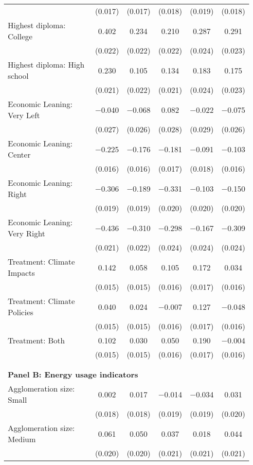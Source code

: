 \begin{tabular}{@{\extracolsep{5pt}}lccccc}
  & (0.017) & (0.017) & (0.018) & (0.019) & (0.018) \\ 
  Highest diploma: College & 0.402 & 0.234 & 0.210 & 0.287 & 0.291 \\ 
  & (0.022) & (0.022) & (0.022) & (0.024) & (0.023) \\ 
  Highest diploma: High school & 0.230 & 0.105 & 0.134 & 0.183 & 0.175 \\ 
  & (0.021) & (0.022) & (0.021) & (0.024) & (0.023) \\ 
  Economic Leaning: Very Left & $-$0.040 & $-$0.068 & 0.082 & $-$0.022 & $-$0.075 \\ 
  & (0.027) & (0.026) & (0.028) & (0.029) & (0.026) \\ 
  Economic Leaning: Center & $-$0.225 & $-$0.176 & $-$0.181 & $-$0.091 & $-$0.103 \\ 
  & (0.016) & (0.016) & (0.017) & (0.018) & (0.016) \\ 
  Economic Leaning: Right & $-$0.306 & $-$0.189 & $-$0.331 & $-$0.103 & $-$0.150 \\ 
  & (0.019) & (0.019) & (0.020) & (0.020) & (0.020) \\ 
  Economic Leaning: Very Right & $-$0.436 & $-$0.310 & $-$0.298 & $-$0.167 & $-$0.309 \\ 
  & (0.021) & (0.022) & (0.024) & (0.024) & (0.024) \\ 
  Treatment: Climate Impacts & 0.142 & 0.058 & 0.105 & 0.172 & 0.034 \\ 
  & (0.015) & (0.015) & (0.016) & (0.017) & (0.016) \\ 
  Treatment: Climate Policies & 0.040 & 0.024 & $-$0.007 & 0.127 & $-$0.048 \\ 
  & (0.015) & (0.015) & (0.016) & (0.017) & (0.016) \\ 
  Treatment: Both & 0.102 & 0.030 & 0.050 & 0.190 & $-$0.004 \\ 
  & (0.015) & (0.015) & (0.016) & (0.017) & (0.016) \\ 
 \\[1ex] \hline \\[1ex]
\multicolumn{ 6 }{l}{\textbf{ Panel B: Energy usage indicators }} \\
  Agglomeration size: Small & 0.002 & 0.017 & $-$0.014 & $-$0.034 & 0.031 \\ 
  & (0.018) & (0.018) & (0.019) & (0.019) & (0.020) \\ 
  Agglomeration size: Medium & 0.061 & 0.050 & 0.037 & 0.018 & 0.044 \\ 
  & (0.020) & (0.020) & (0.021) & (0.021) & (0.021) \\ 

\end{tabular}
